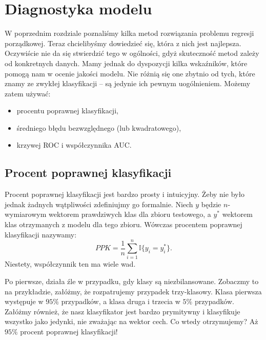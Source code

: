\documentclass{mini}
\begin{document}

\chapter{Diagnostyka modelu}\label{rozdz2}

W poprzednim rozdziale poznaliśmy kilka metod rozwiązania problemu regresji porządkowej. Teraz chcielibyśmy dowiedzieć się, która z nich jest najlepsza. Oczywiście nie da się stwierdzić tego w ogólności, gdyż skuteczność metod zależy od konkretnych danych. Mamy jednak do dyspozycji kilka wskaźników, które pomogą nam w ocenie jakości modelu. Nie różnią się one zbytnio od tych, które znamy ze zwykłej klasyfikacji -- są jedynie ich pewnym uogólnieniem. Możemy zatem używać:
\begin{itemize}
	\item procentu poprawnej klasyfikacji,
	\item średniego błędu bezwzględnego (lub kwadratowego),
	\item krzywej ROC i współczynnika AUC.	
\end{itemize} 

\section{Procent poprawnej klasyfikacji}

Procent poprawnej klasyfikacji jest bardzo prosty i intuicyjny. Żeby nie było jednak żadnych wątpliwości zdefiniujmy go formalnie. Niech $y$ będzie $n$-wymiarowym wektorem prawdziwych klas dla zbioru testowego, a $y^\ast$ wektorem klas otrzymanych z modelu dla tego zbioru. Wówczas procentem poprawnej klasyfikacji nazywamy:
\begin{equation}\label{dop1}
PPK = \frac{1}{n}\sum_{i=1}^n \mathbb{I}{\lbrace y_i=y^\ast_i \rbrace}.
\end{equation}
Niestety, współczynnik ten ma wiele wad. 

Po pierwsze, działa źle w przypadku, gdy klasy są niezbilansowane. Zobaczmy to na przykładzie, załóżmy, że rozpatrujemy przypadek trzy-klasowy. Klasa pierwsza występuje w $95\%$ przypadków, a klasa druga i trzecia w $5\%$ przypadków. Załóżmy również, że nasz klasyfikator jest bardzo prymitywny i klasyfikuje wszystko jako jedynki, nie zważając na wektor cech. Co wtedy otrzymujemy? Aż $95\%$ procent poprawnej klasyfikacji!
\end{document}
